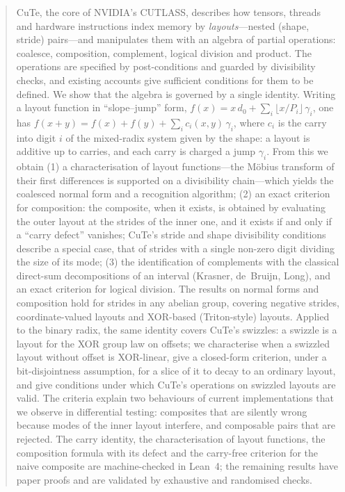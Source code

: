 \begin{abstract}
CuTe, the core of NVIDIA's CUTLASS, describes how tensors, threads and hardware instructions index
memory by \emph{layouts}---nested (shape, stride) pairs---and manipulates them with an algebra of
partial operations: coalesce, composition, complement, logical division and product. The operations
are specified by post-conditions and guarded by divisibility checks, and existing accounts give
sufficient conditions for them to be defined. We show that the algebra is governed by a single
identity. Writing a layout function in ``slope--jump'' form,
$f(x)=x\,d_0+\sum_i\lfloor x/P_i\rfloor\,\gamma_i$, one has
$f(x+y)=f(x)+f(y)+\sum_i c_i(x,y)\,\gamma_i$, where $c_i$ is the carry into digit $i$ of the
mixed-radix system given by the shape: a layout is additive up to carries, and each carry is
charged a jump $\gamma_i$. From this we obtain (1) a characterisation of layout functions---the
M\"obius transform of their first differences is supported on a divisibility chain---which yields
the coalesced normal form and a recognition algorithm; (2) an exact criterion for composition:
the composite, when it exists, is obtained by evaluating the outer layout at the strides of the
inner one, and it exists if and only if a ``carry defect'' vanishes; CuTe's stride and shape
divisibility conditions describe a special case, that of strides with a single non-zero digit
dividing the size of its mode; (3) the identification of complements with the classical
direct-sum decompositions of an interval (Krasner, de~Bruijn, Long), and an exact criterion for
logical division. The results on normal forms and composition hold for strides in any abelian
group,
covering negative strides, coordinate-valued layouts and XOR-based (Triton-style) layouts. Applied
to the binary radix, the same identity covers CuTe's swizzles: a swizzle is a layout for the XOR
group law on offsets; we characterise when a swizzled layout without offset is XOR-linear, give a
closed-form
criterion, under a bit-disjointness assumption, for a slice of it to decay to an ordinary layout,
and give conditions under which CuTe's operations on swizzled layouts are valid. The criteria explain two behaviours of current implementations that we observe in differential
testing: composites that are silently wrong because modes of the inner layout interfere, and
composable pairs that are rejected. The carry identity, the characterisation of layout functions,
the composition formula with its defect and the carry-free criterion for the naive composite are
machine-checked in Lean~4; the remaining results have paper proofs and are validated by exhaustive and randomised
checks.
\end{abstract}
